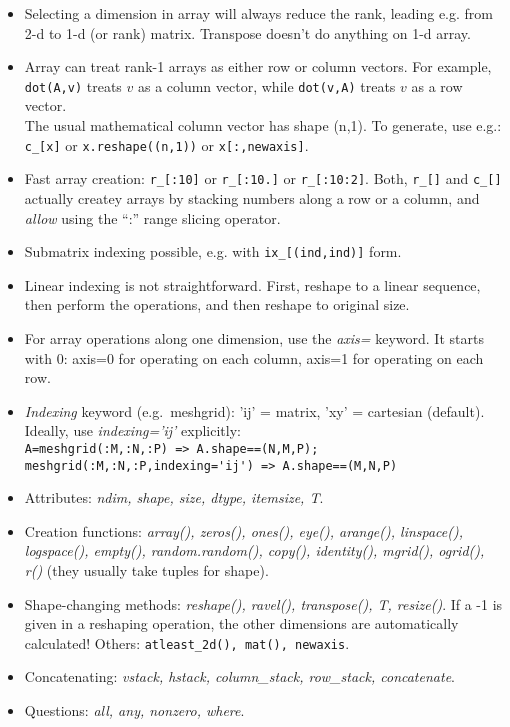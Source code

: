 \documentclass[10pt]{article}
\begin{document}
\begin{enumerate}
\begin{itemize}
  \item Selecting a dimension in array will always reduce the rank,
    leading e.g. from 2-d to 1-d (or rank) matrix. Transpose doesn't
    do anything on 1-d array.
  \item Array can treat rank-1 arrays as either row or column
    vectors. For example, \verb|dot(A,v)| treats $v$ as a column
    vector,
    while \verb|dot(v,A)| treats $v$ as a row vector.\\
    The usual mathematical column vector has shape (n,1). To generate,
    use e.g.: \verb|c_[x]| or \verb|x.reshape((n,1))| or \verb|x[:,newaxis]|.
  \item Fast array creation: \verb|r_[:10]| or \verb|r_[:10.]| or
    \verb|r_[:10:2]|. Both, \verb|r_[]| and \verb|c_[]| actually
    createy arrays by stacking numbers along a row or a column, and
    \emph{allow} using the ``:'' range slicing operator.
  \item Submatrix indexing possible, e.g. with \verb|ix_[(ind,ind)]| form.
  \item Linear indexing is not straightforward. First, reshape to a
    linear sequence, then perform the operations, and then reshape to
    original size.
  \item For array operations along one dimension, use the \emph{axis=}
    keyword. It starts with 0: axis=0 for operating on each column,
    axis=1 for operating on each row.
  \item \emph{Indexing} keyword (e.g.\ meshgrid): 'ij' = matrix, 'xy'
    = cartesian (default). Ideally, use \emph{indexing='ij'}
    explicitly:\\
    \verb|A=meshgrid(:M,:N,:P) => A.shape==(N,M,P); meshgrid(:M,:N,:P,indexing='ij') => A.shape==(M,N,P)|
  \item Attributes: \emph{ndim, shape, size, dtype,
      itemsize, T}.
  \item Creation functions: \emph{array(), zeros(), ones(),
      eye(), arange(), linspace(), logspace(), empty(),
      random.random(), copy(), identity(), mgrid(), ogrid(), r()}
    (they usually take tuples for shape).
  \item Shape-changing methods: \emph{reshape(), ravel(), transpose(),
      T, resize()}. If a -1 is given in a reshaping operation, the
    other dimensions are automatically calculated! Others:
    \verb|atleast_2d(), mat(), newaxis|.
  \item Concatenating: \emph{vstack, hstack, column\_stack, row\_stack,
      concatenate}.
  \item Questions: \emph{all, any, nonzero, where}.

\end{itemize}
\end{enumerate}
\end{document}
